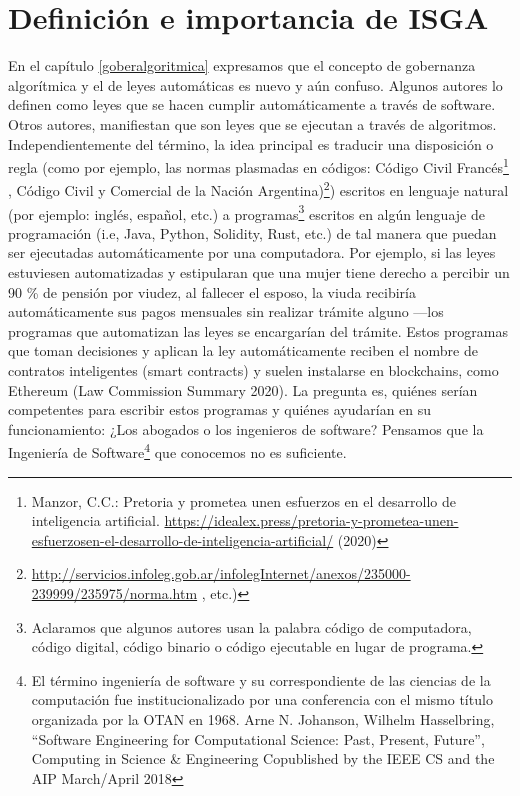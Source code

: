 \documentclass[12pt]{report} %
\begin{document}
\section{Definición e importancia de ISGA }

En el capítulo \ref{goberalgoritmica} expresamos que el concepto de gobernanza algorítmica y el de leyes automáticas es nuevo y aún confuso. Algunos autores lo definen como leyes que se hacen cumplir automáticamente a través de software. Otros autores, manifiestan que son leyes que se ejecutan a través de algoritmos. Independientemente del término, la idea principal es traducir una disposición o regla (como por ejemplo, las normas plasmadas en códigos: Código Civil Francés\footnote{Manzor, C.C.: Pretoria y prometea unen esfuerzos en el desarrollo de inteligencia artificial. \url{https://idealex.press/pretoria-y-prometea-unen-esfuerzosen-el-desarrollo-de-inteligencia-artificial/} (2020)} , Código Civil y Comercial de la Nación Argentina)\footnote {\url{http://servicios.infoleg.gob.ar/infolegInternet/anexos/235000-239999/235975/norma.htm} , etc.) }) escritos en lenguaje natural (por ejemplo: inglés, español, etc.) a programas\footnote{Aclaramos que algunos autores usan la palabra código de computadora, código digital, código binario o código ejecutable en lugar de programa.}  escritos en algún lenguaje de programación (i.e, Java, Python, Solidity, Rust, etc.) de tal manera que puedan ser ejecutadas automáticamente por una computadora. Por ejemplo, si las leyes estuviesen automatizadas y estipularan que una mujer tiene derecho a percibir un 90 \% de pensión por viudez, al fallecer el esposo, la viuda recibiría automáticamente sus pagos mensuales sin realizar trámite alguno —los programas que automatizan las leyes se encargarían del trámite. Estos programas que toman decisiones y aplican la ley automáticamente reciben el nombre de contratos inteligentes (smart contracts) y suelen instalarse en blockchains, como Ethereum (Law Commission Summary 2020). La pregunta es, quiénes serían competentes para escribir estos programas y quiénes ayudarían en su funcionamiento: ¿Los abogados o los ingenieros de software? Pensamos que la Ingeniería de Software\footnote{El término ingeniería de software y su correspondiente de las ciencias de la computación fue institucionalizado por una conferencia con el mismo título organizada por la OTAN en 1968. Arne N. Johanson, Wilhelm Hasselbring, “Software Engineering for Computational Science: Past, Present, Future”, Computing in Science \& Engineering Copublished by the IEEE CS and the AIP March/April 2018}  que conocemos no es suficiente.
\end{document}
